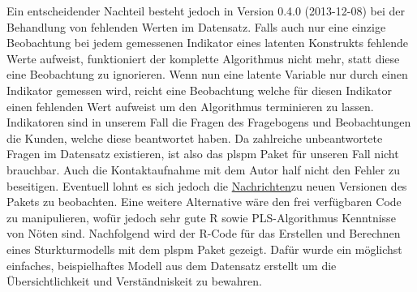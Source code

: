 \documentclass{article}\usepackage[]{graphicx}\usepackage[]{color}
\begin{document}
Ein entscheidender Nachteil besteht jedoch in Version 0.4.0 (2013-12-08) bei der Behandlung von fehlenden Werten im Datensatz. Falls auch nur eine einzige Beobachtung bei jedem gemessenen Indikator eines latenten Konstrukts fehlende Werte aufweist, funktioniert der komplette Algorithmus nicht mehr, statt diese eine Beobachtung zu ignorieren. Wenn nun eine latente Variable nur durch einen Indikator gemessen wird, reicht eine Beobachtung welche für diesen Indikator einen fehlenden Wert aufweist um den Algorithmus terminieren zu lassen. Indikatoren sind in unserem Fall die Fragen des Fragebogens und Beobachtungen die Kunden, welche diese beantwortet haben. Da zahlreiche unbeantwortete Fragen im Datensatz existieren, ist also das plspm Paket für unseren Fall nicht brauchbar. Auch die Kontaktaufnahme mit dem Autor half nicht den Fehler zu beseitigen. Eventuell lohnt es sich jedoch die \href{http://cran.r-project.org/web/packages/plspm/NEWS}{Nachrichten}zu neuen Versionen des Pakets zu beobachten. Eine weitere Alternative wäre den frei verfügbaren Code zu manipulieren, wofür jedoch sehr gute R sowie PLS-Algorithmus Kenntnisse von Nöten sind. Nachfolgend wird der R-Code für das Erstellen und Berechnen eines Sturkturmodells mit dem plspm Paket gezeigt. Dafür wurde ein möglichst einfaches, beispielhaftes Modell aus dem Datensatz erstellt um die Übersichtlichkeit und Verständniskeit zu bewahren.
\end{document}
